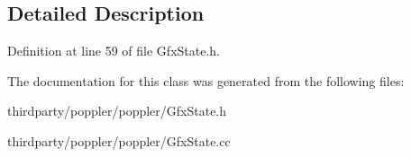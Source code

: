 \subsection{Detailed Description}


Definition at line 59 of file Gfx\+State.\+h.



The documentation for this class was generated from the following files\+:\begin{DoxyCompactItemize}
\item 
thirdparty/poppler/poppler/Gfx\+State.\+h\item 
thirdparty/poppler/poppler/Gfx\+State.\+cc\end{DoxyCompactItemize}
